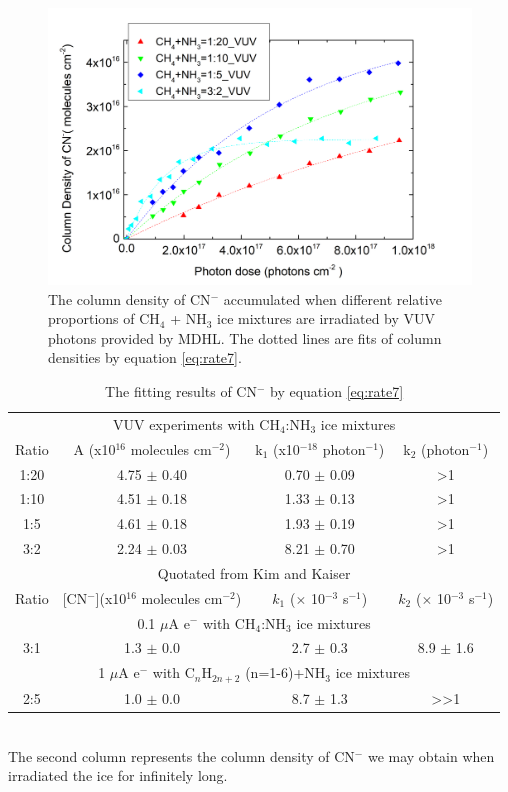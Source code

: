 \begin{figure}
\centering
\includegraphics[width=\textwidth]{figures/chapter3/CN_rate_VUV.png}
\caption{The column density of CN$^-$ accumulated when different relative proportions of CH$_4$ + NH$_3$ ice mixtures are irradiated by VUV photons provided by MDHL. The dotted lines are fits of column densities by equation \ref{eq:rate7}.}
\label{fig:CNrate}
\end{figure}

\begin{table}[htbp]
\caption{The fitting results of CN$^-$ by equation \ref{eq:rate7}}
\label{tab:CNrate}
\begin{tabular}{cccc}
\hline
\hline
\multicolumn{4}{c}{VUV experiments with CH$_4$:NH$_3$ ice mixtures}\\
Ratio & A (x10$^{16}$ molecules cm$^{-2}$) & k$_1$ (x10$^{-18}$ photon$^{-1}$) & k$_2$ (photon$^{-1}$)\\
\hline
1:20 & 4.75 $\pm$ 0.40 & 0.70 $\pm$ 0.09 & >1 \\
1:10 & 4.51 $\pm$ 0.18 & 1.33 $\pm$ 0.13 & >1 \\
1:5 & 4.61 $\pm$ 0.18 & 1.93 $\pm$ 0.19 & >1 \\
3:2 & 2.24 $\pm$ 0.03 & 8.21 $\pm$ 0.70 & >1 \\
\hline
\hline
\multicolumn{4}{c}{Quotated from Kim and Kaiser\cite{kim}} \\
Ratio & [CN$^-$](x10$^{16}$ molecules cm$^{-2}$) & $k_1$ ($\times$ 10$^{-3}$ s$^{-1}$) &  $k_2$  ($\times$ 10$^{-3}$ s$^{-1}$)\\
\hline
\multicolumn{4}{c}{0.1 $\mu$A e$^-$ with CH$_4$:NH$_3$ ice mixtures}\\
3:1 & 1.3 $\pm$ 0.0 & 2.7 $\pm$ 0.3 & 8.9 $\pm$ 1.6 \\
\hline
\multicolumn{4}{c}{1 $\mu$A e$^-$ with C$_n$H$_{2n+2}$ (n=1-6)+NH$_3$ ice mixtures}\\
2:5 & 1.0 $\pm$ 0.0 & 8.7 $\pm$ 1.3 & >>1 \\
\hline
\end{tabular}\\
The second column represents the column density of CN$^-$ we may obtain when irradiated the ice for infinitely long.\
\end{table}

